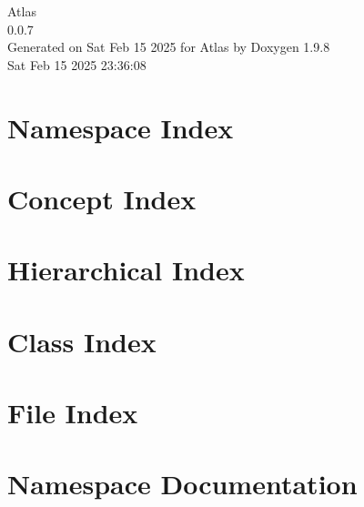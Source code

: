 \documentclass[twoside]{book}
\newcommand{\+}{\discretionary{\mbox{\scriptsize$\hookleftarrow$}}{}{}}
\newcommand{\clearemptydoublepage}{%
    \newpage{\pagestyle{empty}\cleardoublepage}%
  }
\begin{document}
  \raggedbottom
    \hypersetup{pageanchor=false,
                bookmarksnumbered=true,
                pdfencoding=unicode
               }
  \begin{titlepage}
  \vspace*{7cm}
  \begin{center}%
  {\Large Atlas}\\
  [1ex]\large 0.\+0.\+7 \\
  \vspace*{1cm}
  {\large Generated on Sat Feb 15 2025 for Atlas by Doxygen 1.9.8}\\
    \vspace*{0.5cm}
    {\small Sat Feb 15 2025 23:36:08}
  \end{center}
  \end{titlepage}
  \clearemptydoublepage
  \tableofcontents
  \clearemptydoublepage
  \hypersetup{pageanchor=true}






\chapter{Namespace Index}

\chapter{Concept Index}

\chapter{Hierarchical Index}

\chapter{Class Index}

\chapter{File Index}

\chapter{Namespace Documentation}














\end{document}
